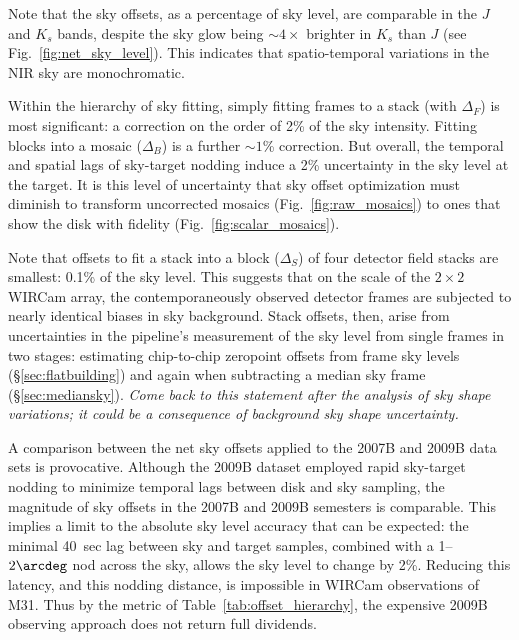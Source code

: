 \documentclass[iop]{emulateapj}
\newcommand{\mycomment}[1]{\textcolor{OliveGreen}{\textit{#1}}} %
\newcommand{\Fig}[1]{Fig.~\ref{fig:#1}}  %
\newcommand{\Tab}[1]{Table~\ref{tab:#1}}  %
\newcommand{\Sec}[1]{\S\ref{sec:#1}}  %
\begin{document}

Note that the sky offsets, as a percentage of sky level, are comparable in the $J$ and $K_s$ bands, despite the sky glow being $\sim 4\times$ brighter in $K_s$ than $J$ (see \Fig{net_sky_level}).
This indicates that spatio-temporal variations in the NIR sky are monochromatic.

Within the hierarchy of sky fitting, simply fitting frames to a stack (with $\Delta_F$) is most significant: a correction on the order of 2\% of the sky intensity.
Fitting blocks into a mosaic ($\Delta_B$) is a further $\sim 1$\% correction.
But overall, the temporal and spatial lags of sky-target nodding induce a 2\% uncertainty in the sky level at the target.
It is this level of uncertainty that sky offset optimization must diminish to transform uncorrected mosaics (\Fig{raw_mosaics}) to ones that show the disk with fidelity (\Fig{scalar_mosaics}).

Note that offsets to fit a stack into a block ($\Delta_S$) of four detector field stacks are smallest: 0.1\% of the sky level.
This suggests that on the scale of the $2\times 2$ WIRCam array, the contemporaneously observed detector frames are subjected to nearly identical biases in sky background.
Stack offsets, then, arise from uncertainties in the pipeline's measurement of the sky level from single frames in two stages: estimating chip-to-chip zeropoint offsets from frame sky levels (\Sec{flatbuilding}) and again when subtracting a median sky frame (\Sec{mediansky}).  \mycomment{Come back to this statement after the analysis of sky shape variations; it could be a consequence of background sky shape uncertainty.}

A comparison between the net sky offsets applied to the 2007B and 2009B data sets is provocative.
Although the 2009B dataset employed rapid sky-target nodding to minimize temporal lags between disk and sky sampling, the magnitude of sky offsets in the 2007B and 2009B semesters is comparable.
This implies a limit to the absolute sky level accuracy that can be expected: the minimal 40~sec lag between sky and target samples, combined with a 1--$2\arcdeg$ nod across the sky, allows the sky level to change by 2\%.
Reducing this latency, and this nodding distance, is impossible in WIRCam observations of M31.
Thus by the metric of \Tab{offset_hierarchy}, the expensive 2009B observing approach does not return full dividends.
\end{document}
